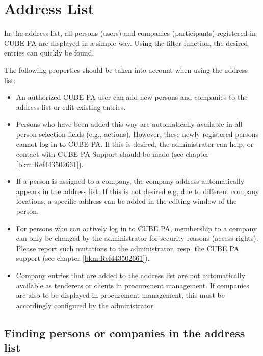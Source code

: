 
\clearpage
\section{Address List}
\label{bkm:Ref443738751}
In the address list, all persons (users) and companies (participants) registered in CUBE PA are displayed in a simple way. Using the filter function, the desired entries can quickly be found.

\vspace{\baselineskip}

The following properties should be taken into account when using the address list:

\begin{itemize}
\item
An authorized CUBE PA user can add new persons and companies to the address list or edit existing entries.

\item
Persons who have been added this way are automatically available in all person selection fields (e.g., actions). However, these newly registered persons cannot log in to CUBE PA. If this is desired, the administrator can help, or contact with CUBE PA Support should be made (see chapter \ref{bkm:Ref443502661}).

\item
If a person is assigned to a company, the company address automatically appears in the address list. If this is not desired e.g. due to different company locations, a specific address can be added in the editing window of the person.

\item
For persons who can actively log in to CUBE PA, membership to a company can only be changed by the administrator for security reasons (access rights). Please report such mutations to the administrator, resp. the CUBE PA support (see chapter \ref{bkm:Ref443502661}).

\item
Company entries that are added to the address list are not automatically available as tenderers or clients in procurement management. If companies are also to be displayed in procurement management, this must be accordingly configured by the administrator.
\end{itemize}

\pagebreak
\subsection{Finding persons or companies in the address list}

